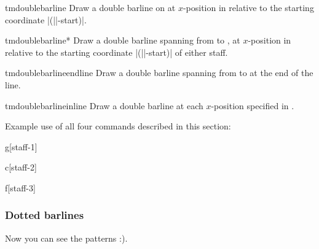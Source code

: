 \documentclass[11pt,a4paper]{ltxdoc}
\begin{document}
\begin{docCommand}{tmdoublebarline}{}
  Draw a double barline on  at $x$-position  in 
  relative to the starting coordinate |(||-start)|.
\end{docCommand}
\begin{docCommand}{tmdoublebarline*}{}
  Draw a double barline spanning from  to 
  , at $x$-position  in relative to 
  the starting coordinate |(||-start)| of either staff.
\end{docCommand}
\begin{docCommand}{tmdoublebarlineendline}{}
  Draw a double barline spanning from  to 
   at the end of the line.
\end{docCommand}
\begin{docCommand}{tmdoublebarlineinline}{}
  Draw a double barline at each $x$-position specified in .
\end{docCommand}
Example use of all four commands described in this section:
\begin{dispExample}
\begin{tmmultiplestaves}[0pt]%
  \begin{tmstaff}{g}[staff-1]
  \end{tmstaff}%
  \begin{tmstaff}{c}[staff-2]
  \end{tmstaff}%
  \begin{tmstaff}{f}[staff-3]
  \end{tmstaff}%
\end{tmmultiplestaves}
\end{dispExample}


\subsubsection{Dotted barlines}\label{sec:multistaff:barlines:dotted}
Now you can see the patterns :).
\end{document}
